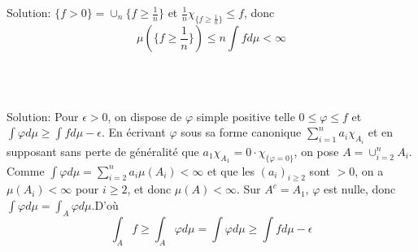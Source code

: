 \documentclass{report}
\begin{document}
Solution: $\{f>0\} = \cup_n \{f\geq \frac 1n \}$ et $\displaystyle \frac 1n \chi_{\{f\geq \frac 1n\}}\leq f$, donc $$\mu(\{f\geq \frac 1n\})\leq n\int f d\mu <\infty $$

\subsection{} \\ \\

Solution: Pour $\epsilon >0$, on dispose de $\varphi$ simple positive telle $0\leq \varphi \leq f$ et \newline
$\int \varphi d\mu \geq \int f d\mu - \epsilon$. En écrivant $\varphi$ sous sa forme canonique $\sum_{i=1}^n a_i \chi_{A_i}$ et en supposant sans perte de généralité que $a_1\chi_{A_1} =0 \cdot \chi_{\{\varphi = 0\}}$, on pose $A = \cup_{i=2}^n A_i$. Comme $\int \varphi d\mu = \sum_{i=2}^n a_i \mu(A_i)<\infty$ et que les $(a_i)_{i\geq 2}$ sont $> 0$, on a $\mu(A_i)<\infty$ pour $i\geq 2$, et donc $\mu(A)<\infty$. \newline
Sur $A^c = A_1$, $\varphi$ est nulle, donc $\int \varphi d\mu  = \int_{A} \varphi d\mu$.\newline  D'où $$\int_A f\geq  \int_A \varphi d\mu = \int \varphi d\mu  \geq \int f d\mu - \epsilon$$ 
\end{document}
